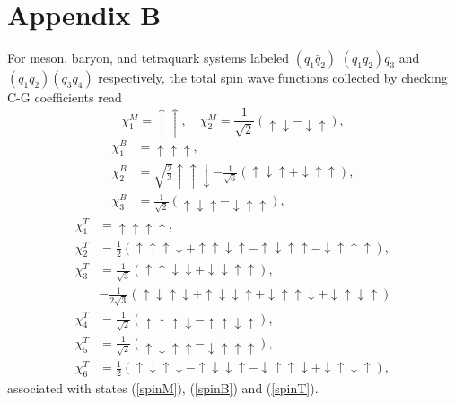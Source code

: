 \documentclass[prd,twocolumn,floatfix,nofootinbib]{revtex4}
\begin{document}
\section*{Appendix B}\label{AppendixB}
\setcounter{equation}{0}
\renewcommand{\theequation}{B\arabic{equation}}
For meson, baryon, and tetraquark systems labeled $(q_{1}\bar{q}_{2})$ $(q_{1}q_{2})q_{3}$ and $(q_{1}q_{2})(\bar{q}_{3}\bar{q}_{4})$ respectively,
the total spin wave functions collected by checking C-G coefficients read
\begin{equation}\label{pspinM}
    \chi_{1}^{M}=\uparrow\uparrow, \quad \chi_{2}^{M}=\frac{1}{\sqrt{2}} \left(\uparrow\downarrow-\downarrow\uparrow\right),
\end{equation}
\begin{equation}\label{pspinB}
    \begin{aligned}
        \chi_{1}^{B}&=\uparrow\uparrow\uparrow, \\
        \chi_{2}^{B}&=\sqrt{\frac{2}{3}}\uparrow\uparrow\downarrow-\frac{1}{\sqrt{6}} \left(\uparrow\downarrow\uparrow+\downarrow\uparrow\uparrow\right), \\
        \chi_{3}^{B}&=\frac{1}{\sqrt{2}} \left(\uparrow\downarrow\uparrow-\downarrow\uparrow\uparrow\right),
    \end{aligned}
\end{equation}
\begin{equation}\label{pspinT}
    \begin{aligned}
        \chi_{1}^{T}&=\uparrow\uparrow\uparrow\uparrow, \\
        \chi_{2}^{T}&=\frac{1}{2} \left(\uparrow\uparrow\uparrow\downarrow+\uparrow\uparrow\downarrow\uparrow-\uparrow\downarrow\uparrow\uparrow-\downarrow\uparrow\uparrow\uparrow\right), \\
        \chi_{3}^{T}&=\frac{1}{\sqrt{3}} \left(\uparrow\uparrow\downarrow\downarrow+\downarrow\downarrow\uparrow\uparrow\right), \\
        &-\frac{1}{2\sqrt{3}} \left(\uparrow\downarrow\uparrow\downarrow+\uparrow\downarrow\downarrow\uparrow+\downarrow\uparrow\uparrow\downarrow+\downarrow\uparrow\downarrow\uparrow\right) \\
        \chi_{4}^{T}&=\frac{1}{\sqrt{2}} \left(\uparrow\uparrow\uparrow\downarrow-\uparrow\uparrow\downarrow\uparrow\right), \\
        \chi_{5}^{T}&=\frac{1}{\sqrt{2}} \left(\uparrow\downarrow\uparrow\uparrow-\downarrow\uparrow\uparrow\uparrow\right), \\
        \chi_{6}^{T}&=\frac{1}{2} \left(\uparrow\downarrow\uparrow\downarrow-\uparrow\downarrow\downarrow\uparrow-\downarrow\uparrow\uparrow\downarrow+\downarrow\uparrow\downarrow\uparrow\right),
    \end{aligned}
\end{equation}
associated with states (\ref{spinM}), (\ref{spinB}) and (\ref{spinT}).
\end{document}
